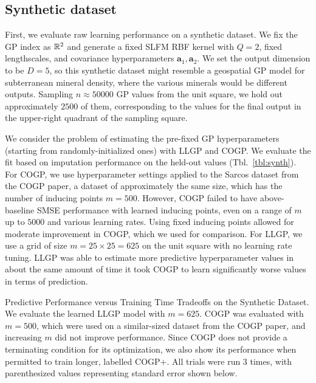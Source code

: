 \documentclass[twoside]{article}
\begin{document}
\subsection{Synthetic dataset}\label{synth-bench}


First, we evaluate raw learning performance on a synthetic dataset. We fix the GP index as $\mathbb{R}^2$ and generate a fixed SLFM RBF kernel with $Q=2$, fixed lengthscales, and covariance hyperparameters $\textbf{a}_1,\textbf{a}_2$. We set the output dimension to be $D=5$, so this synthetic dataset might resemble a geospatial GP model for subterranean mineral density, where the various minerals would be different outputs. Sampling $n\approx 50000$ GP values from the unit square, we hold out approximately $2500$ of them, corresponding to the values for the final output in the upper-right quadrant of the sampling square.

We consider the problem of estimating the pre-fixed GP hyperparameters (starting from randomly-initialized ones) with LLGP and COGP. We evaluate the fit based on imputation performance on the held-out values (Tbl.~\ref{tbl:synth}). For COGP, we use hyperparameter settings applied to the Sarcos dataset from the COGP paper, a dataset of approximately the same size, which has the number of inducing points $m=500$. However, COGP failed to have above-baseline SMSE performance with learned inducing points, even on a range of $m$ up to $5000$ and various learning rates. Using fixed inducing points allowed for moderate improvement in COGP, which we used for comparison. For LLGP, we use a grid of size $m=25\times 25=625$ on the unit square with no learning rate tuning. LLGP was able to estimate more predictive hyperparameter values in about the same amount of time it took COGP to learn significantly worse values in terms of prediction.

\begin{table}[!ht]
\caption{Predictive Performance versus Training Time Tradeoffs on the Synthetic Dataset. We evaluate the learned LLGP model with $m=625$. COGP was evaluated with $m=500$, which were used on a similar-sized dataset from the COGP paper, and increasing $m$ did not improve performance. Since COGP does not provide a terminating condition for its optimization, we also show its performance when permitted to train longer, labelled COGP+. All trials were run 3 times, with parenthesized values representing standard error shown below.}
\label{tbl:synth}
\begin{center}
  \begin{small}
    \begin{sc}

\end{sc}
\end{small}
\end{center}

\end{table}
\end{document}
